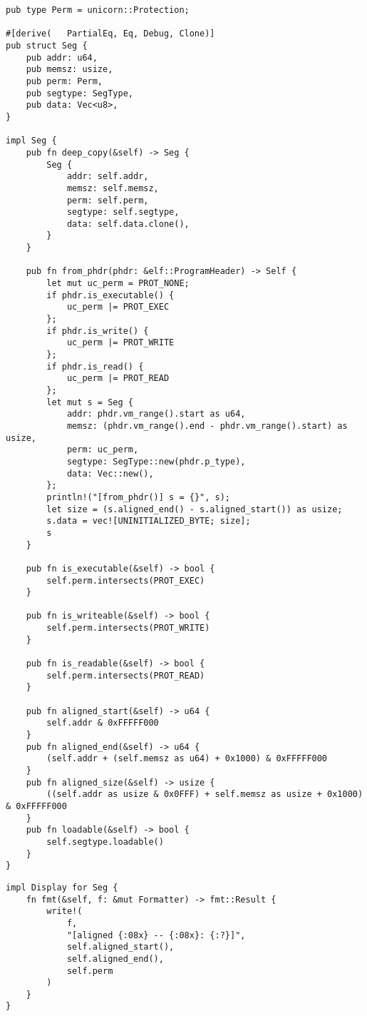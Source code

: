 \documentclass[11pt]{article}
\begin{document}
\lstset{language=rust,label=orga19db0a,caption= ,captionpos=b,numbers=none}
\begin{lstlisting}
pub type Perm = unicorn::Protection;

#[derive(   PartialEq, Eq, Debug, Clone)]
pub struct Seg {
    pub addr: u64,
    pub memsz: usize,
    pub perm: Perm,
    pub segtype: SegType,
    pub data: Vec<u8>,
}

impl Seg {
    pub fn deep_copy(&self) -> Seg {
        Seg {
            addr: self.addr,
            memsz: self.memsz,
            perm: self.perm,
            segtype: self.segtype,
            data: self.data.clone(),
        }
    }

    pub fn from_phdr(phdr: &elf::ProgramHeader) -> Self {
        let mut uc_perm = PROT_NONE;
        if phdr.is_executable() {
            uc_perm |= PROT_EXEC
        };
        if phdr.is_write() {
            uc_perm |= PROT_WRITE
        };
        if phdr.is_read() {
            uc_perm |= PROT_READ
        };
        let mut s = Seg {
            addr: phdr.vm_range().start as u64,
            memsz: (phdr.vm_range().end - phdr.vm_range().start) as usize,
            perm: uc_perm,
            segtype: SegType::new(phdr.p_type),
            data: Vec::new(),
        };
        println!("[from_phdr()] s = {}", s);
        let size = (s.aligned_end() - s.aligned_start()) as usize;
        s.data = vec![UNINITIALIZED_BYTE; size];
        s
    }

    pub fn is_executable(&self) -> bool {
        self.perm.intersects(PROT_EXEC)
    }

    pub fn is_writeable(&self) -> bool {
        self.perm.intersects(PROT_WRITE)
    }

    pub fn is_readable(&self) -> bool {
        self.perm.intersects(PROT_READ)
    }

    pub fn aligned_start(&self) -> u64 {
        self.addr & 0xFFFFF000
    }
    pub fn aligned_end(&self) -> u64 {
        (self.addr + (self.memsz as u64) + 0x1000) & 0xFFFFF000
    }
    pub fn aligned_size(&self) -> usize {
        ((self.addr as usize & 0x0FFF) + self.memsz as usize + 0x1000) & 0xFFFFF000
    }
    pub fn loadable(&self) -> bool {
        self.segtype.loadable()
    }
}
\end{lstlisting}

\lstset{language=rust,label=orgcb1b6c6,caption= ,captionpos=b,numbers=none}
\begin{lstlisting}
impl Display for Seg {
    fn fmt(&self, f: &mut Formatter) -> fmt::Result {
        write!(
            f,
            "[aligned {:08x} -- {:08x}: {:?}]",
            self.aligned_start(),
            self.aligned_end(),
            self.perm
        )
    }
}
\end{lstlisting}
\end{document}
